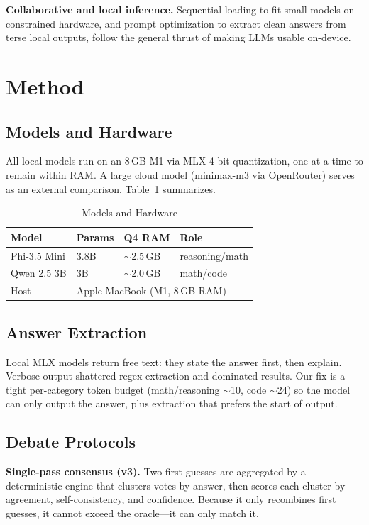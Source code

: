 \documentclass[conference,compsoc]{IEEEtran}
\begin{document}
\textbf{Collaborative and local inference.} Sequential loading to fit small models on constrained hardware, and prompt optimization to extract clean answers from terse local outputs, follow the general thrust of making LLMs usable on-device\cite{hannun2023mlx}.

\section{Method}
\subsection{Models and Hardware}
All local models run on an 8\,GB M1 via MLX 4-bit quantization, one at a time to remain within RAM. A large cloud model (minimax-m3 via OpenRouter) serves as an external comparison. Table~\ref{tab:models} summarizes.

\begin{table}[htbp]
\centering
\caption{Models and Hardware}
\label{tab:models}
\begin{tabular}{@{}llll@{}}
\toprule
Model & Params & Q4 RAM & Role \\
\midrule
Phi-3.5 Mini & 3.8B & $\sim$2.5\,GB & reasoning/math \\
Qwen 2.5 3B & 3B & $\sim$2.0\,GB & math/code \\
\midrule
Host & \multicolumn{3}{l}{Apple MacBook (M1, 8\,GB RAM)} \\
\bottomrule
\end{tabular}
\end{table}

\subsection{Answer Extraction}
Local MLX models return free text: they state the answer first, then explain. Verbose output shattered regex extraction and dominated results. Our fix is a tight per-category token budget (math/reasoning $\sim$10, code $\sim$24) so the model can only output the answer, plus extraction that prefers the start of output.

\subsection{Debate Protocols}
\textbf{Single-pass consensus (v3).} Two first-guesses are aggregated by a deterministic engine\cite{swarmrepo} that clusters votes by answer, then scores each cluster by agreement, self-consistency, and confidence. Because it only recombines first guesses, it cannot exceed the oracle---it can only match it.
\end{document}
